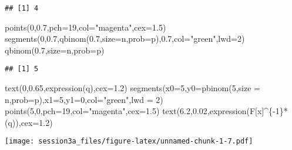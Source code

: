 \documentclass[
]{article}
\newenvironment{Shaded}{\begin{snugshade}}{\end{snugshade}}
\newcommand{\AttributeTok}[1]{\textcolor[rgb]{0.77,0.63,0.00}{#1}}
\newcommand{\DecValTok}[1]{\textcolor[rgb]{0.00,0.00,0.81}{#1}}
\newcommand{\FloatTok}[1]{\textcolor[rgb]{0.00,0.00,0.81}{#1}}
\newcommand{\FunctionTok}[1]{\textcolor[rgb]{0.00,0.00,0.00}{#1}}
\newcommand{\NormalTok}[1]{#1}
\newcommand{\SpecialCharTok}[1]{\textcolor[rgb]{0.00,0.00,0.00}{#1}}
\newcommand{\StringTok}[1]{\textcolor[rgb]{0.31,0.60,0.02}{#1}}
\begin{document}
\begin{verbatim}
## [1] 4
\end{verbatim}

\begin{Shaded}
\begin{Highlighting}[]
\FunctionTok{points}\NormalTok{(}\DecValTok{0}\NormalTok{,}\FloatTok{0.7}\NormalTok{,}\AttributeTok{pch=}\DecValTok{19}\NormalTok{,}\AttributeTok{col=}\StringTok{"magenta"}\NormalTok{,}\AttributeTok{cex=}\FloatTok{1.5}\NormalTok{)}
\FunctionTok{segments}\NormalTok{(}\DecValTok{0}\NormalTok{,}\FloatTok{0.7}\NormalTok{,}\FunctionTok{qbinom}\NormalTok{(}\FloatTok{0.7}\NormalTok{,}\AttributeTok{size=}\NormalTok{n,}\AttributeTok{prob=}\NormalTok{p),}\FloatTok{0.7}\NormalTok{,}\AttributeTok{col=}\StringTok{"green"}\NormalTok{,}\AttributeTok{lwd=}\DecValTok{2}\NormalTok{)}
\FunctionTok{qbinom}\NormalTok{(}\FloatTok{0.7}\NormalTok{,}\AttributeTok{size=}\NormalTok{n,}\AttributeTok{prob=}\NormalTok{p)}
\end{Highlighting}
\end{Shaded}

\begin{verbatim}
## [1] 5
\end{verbatim}

\begin{Shaded}
\begin{Highlighting}[]
\FunctionTok{text}\NormalTok{(}\DecValTok{0}\NormalTok{,}\FloatTok{0.65}\NormalTok{,}\FunctionTok{expression}\NormalTok{(q),}\AttributeTok{cex=}\FloatTok{1.2}\NormalTok{)}
\FunctionTok{segments}\NormalTok{(}\AttributeTok{x0=}\DecValTok{5}\NormalTok{,}\AttributeTok{y0=}\FunctionTok{pbinom}\NormalTok{(}\DecValTok{5}\NormalTok{,}\AttributeTok{size =}\NormalTok{ n,}\AttributeTok{prob=}\NormalTok{p),}\AttributeTok{x1=}\DecValTok{5}\NormalTok{,}\AttributeTok{y1=}\DecValTok{0}\NormalTok{,}\AttributeTok{col=}\StringTok{"green"}\NormalTok{,}\AttributeTok{lwd =} \DecValTok{2}\NormalTok{)}
\FunctionTok{points}\NormalTok{(}\DecValTok{5}\NormalTok{,}\DecValTok{0}\NormalTok{,}\AttributeTok{pch=}\DecValTok{19}\NormalTok{,}\AttributeTok{col=}\StringTok{"magenta"}\NormalTok{,}\AttributeTok{cex=}\FloatTok{1.5}\NormalTok{)}
\FunctionTok{text}\NormalTok{(}\FloatTok{6.2}\NormalTok{,}\FloatTok{0.02}\NormalTok{,}\FunctionTok{expression}\NormalTok{(F[x]}\SpecialCharTok{\^{}}\NormalTok{\{}\SpecialCharTok{{-}}\DecValTok{1}\NormalTok{\}}\SpecialCharTok{*}\NormalTok{(q)),}\AttributeTok{cex=}\FloatTok{1.2}\NormalTok{)}
\end{Highlighting}
\end{Shaded}

\texttt{[image: session3a\_files/figure-latex/unnamed-chunk-1-7.pdf]}
\end{document}
